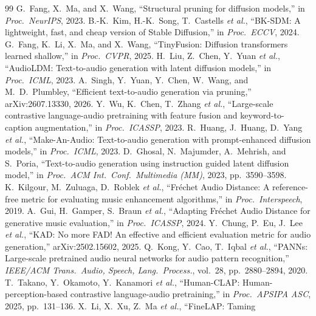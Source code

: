 \documentclass{article}
\begin{document}
\clearpage
{\setlength{\itemsep}{0pt}\setlength{\parsep}{0pt}
\begin{thebibliography}{99}
 G.~Fang, X.~Ma, and X.~Wang, ``Structural pruning for diffusion
models,'' in \emph{Proc.\ NeurIPS}, 2023.
 B.-K.~Kim, H.-K.~Song, T.~Castells \emph{et al.}, ``BK-SDM: A lightweight, fast,
and cheap version of Stable Diffusion,'' in \emph{Proc.\ ECCV}, 2024.
 G.~Fang, K.~Li, X.~Ma, and X.~Wang, ``TinyFusion: Diffusion transformers
learned shallow,'' in \emph{Proc.\ CVPR}, 2025.
 H.~Liu, Z.~Chen, Y.~Yuan \emph{et al.}, ``AudioLDM: Text-to-audio generation with latent diffusion models,'' in
\emph{Proc.\ ICML}, 2023.
 A.~Singh, Y.~Yuan, Y.~Chen, W.~Wang, and M.~D.~Plumbley, ``Efficient
text-to-audio generation via pruning,'' arXiv:2607.13330, 2026.
 Y.~Wu, K.~Chen, T.~Zhang \emph{et al.},
``Large-scale contrastive language-audio pretraining with feature fusion and keyword-to-caption
augmentation,'' in \emph{Proc.\ ICASSP}, 2023.
 R.~Huang, J.~Huang, D.~Yang \emph{et al.}, ``Make-An-Audio:
Text-to-audio generation with prompt-enhanced diffusion models,'' in \emph{Proc.\ ICML}, 2023.
 D.~Ghosal, N.~Majumder, A.~Mehrish, and S.~Poria, ``Text-to-audio generation
using instruction guided latent diffusion model,'' in \emph{Proc.\ ACM Int.\ Conf.\ Multimedia (MM)},
2023, pp.~3590--3598.
 K.~Kilgour, M.~Zuluaga, D.~Roblek \emph{et al.}, ``Fr\'echet Audio
Distance: A reference-free metric for evaluating music enhancement algorithms,'' in
\emph{Proc.\ Interspeech}, 2019.
 A.~Gui, H.~Gamper, S.~Braun \emph{et al.}, ``Adapting Fr\'echet Audio
Distance for generative music evaluation,'' in \emph{Proc.\ ICASSP}, 2024.
 Y.~Chung, P.~Eu, J.~Lee \emph{et al.}, ``KAD: No more FAD!
An effective and efficient evaluation metric for audio generation,'' arXiv:2502.15602, 2025.
 Q.~Kong, Y.~Cao, T.~Iqbal \emph{et al.}, ``PANNs:
Large-scale pretrained audio neural networks for audio pattern recognition,'' \emph{IEEE/ACM
Trans.\ Audio, Speech, Lang.\ Process.}, vol.~28, pp.~2880--2894, 2020.
 T.~Takano, Y.~Okamoto, Y.~Kanamori \emph{et al.}, ``Human-CLAP:
Human-perception-based contrastive language-audio pretraining,'' in \emph{Proc.\ APSIPA ASC}, 2025,
pp.~131--136.
 X.~Li, X.~Xu, Z.~Ma \emph{et al.}, ``FineLAP: Taming

\end{thebibliography}}
\end{document}
